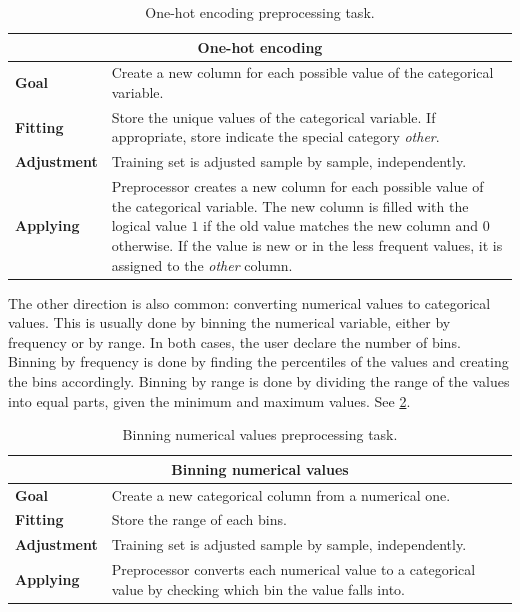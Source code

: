\begin{table}\caption{One-hot encoding preprocessing task.}
  \centering
  \begin{tabular}{lp{6cm}}
    \toprule
    \multicolumn{2}{c}{\textbf{One-hot encoding}} \\
    \midrule
    \textbf{Goal} &
      Create a new column for each possible value of the categorical variable. \\
    \textbf{Fitting} &
      Store the unique values of the categorical variable.  If appropriate, store indicate
      the special category \emph{other}.  \\
    \textbf{Adjustment} &
      Training set is adjusted sample by sample, independently. \\
    \textbf{Applying} &
      Preprocessor creates a new column for each possible value of the categorical
      variable.  The new column is filled with the logical value $1$ if the old value
      matches the new column and $0$ otherwise.  If the value is new or in the less
      frequent values, it is assigned to the \emph{other} column.  \\
    \bottomrule
  \end{tabular}
  \label{tab:one-hot}
\end{table}

The other direction is also common: converting numerical values to categorical values.
This is usually done by binning the numerical variable, either by frequency or by range.
In both cases, the user declare the number of bins.  Binning by frequency is done by
finding the percentiles of the values and creating the bins accordingly.  Binning by
range is done by dividing the range of the values into equal parts, given the minimum and
maximum values.  See \cref{tab:binning}.

\begin{table}\caption{Binning numerical values preprocessing task.}
  \centering
  \begin{tabular}{lp{6cm}}
    \toprule
    \multicolumn{2}{c}{\textbf{Binning numerical values}} \\
    \midrule
    \textbf{Goal} &
      Create a new categorical column from a numerical one.  \\
    \textbf{Fitting} &
      Store the range of each bins. \\
    \textbf{Adjustment} &
      Training set is adjusted sample by sample, independently. \\
    \textbf{Applying} &
      Preprocessor converts each numerical value to a categorical value by checking
      which bin the value falls into. \\
    \bottomrule
  \end{tabular}
  \label{tab:binning}
\end{table}

